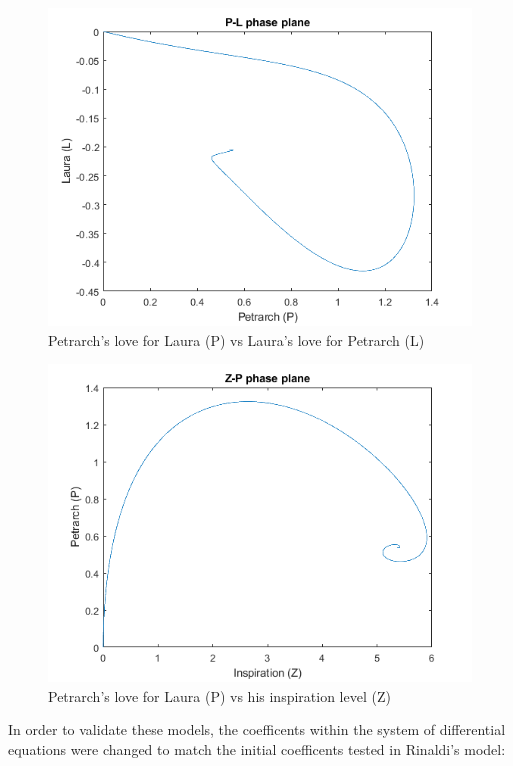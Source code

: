 \documentclass[11pt]{article}
\begin{document}
\begin{figure} [h]
\centering
        \includegraphics[totalheight=10cm]{love2.png}
    \caption{Petrarch's love for Laura (P) vs Laura's love for Petrarch (L)}
    \label{figure6}
\end{figure}

\begin{figure} [h]
\centering
        \includegraphics[totalheight=10cm]{love3.png}
    \caption{Petrarch's love for Laura (P) vs his inspiration level (Z)}
    \label{figure6}
\end{figure}

In order to validate these models, the coefficents within the system of differential
equations were changed to match the initial coefficents tested in Rinaldi's 
model:
\end{document}
